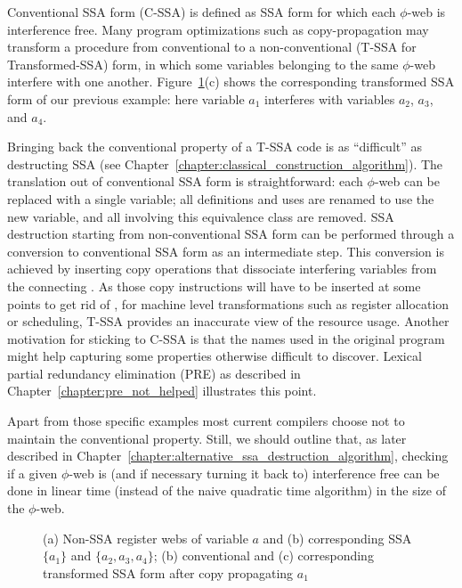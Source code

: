 Conventional SSA form (C-SSA) is defined as SSA form for which each $\phi$-web
is interference free. Many program optimizations such as copy-propagation may transform a procedure from conventional
to a non-conventional (T-SSA for Transformed-SSA) form, in which some variables belonging to
the same $\phi$-web interfere with one another. Figure~\ref{fig:properties_and_flavors:conventional}(c)
shows the corresponding transformed SSA form of our previous example: here variable $a_1$ interferes with variables $a_2$, $a_3$, and $a_4$.

Bringing back the conventional property of a T-SSA code is as ``difficult'' as destructing SSA (see Chapter~\ref{chapter:classical_construction_algorithm}). 
The translation out of conventional SSA form
is straightforward: each $\phi$-web can be replaced with a single
variable; all definitions and uses are renamed to use the new variable,
and all \phifuns involving this equivalence class are removed. 
SSA destruction
starting from non-conventional SSA form can be performed through a conversion to 
conventional SSA form as an intermediate step. This conversion is
achieved by inserting copy operations that dissociate interfering variables from the connecting \phifuns. 
As those copy instructions will have to be inserted at some points to get rid of \phifuns, for machine level transformations such as register allocation or scheduling, T-SSA provides an inaccurate view of the resource usage. Another motivation for sticking to C-SSA is that the names used in the original program might help capturing some properties otherwise difficult to discover. Lexical partial redundancy elimination (PRE) as described in Chapter~\ref{chapter:pre_not_helped} illustrates this point.

Apart from those specific examples most current compilers choose not to maintain the conventional property.
Still, we should outline that, as later described in Chapter~\ref{chapter:alternative_ssa_destruction_algorithm}, checking if a given $\phi$-web is (and if necessary turning it back to) interference free can be done in linear time (instead of the naive quadratic time algorithm) in the size of the $\phi$-web.

\begin{figure}[h]
\caption{\label{fig:properties_and_flavors:conventional}(a) Non-SSA register webs of variable $a$ and (b) corresponding SSA \phiwebs $\{a_1\}$ and $\{a_2,a_3,a_4\}$; (b) conventional and (c) corresponding transformed SSA form after copy propagating $a_1$}
\end{figure}



